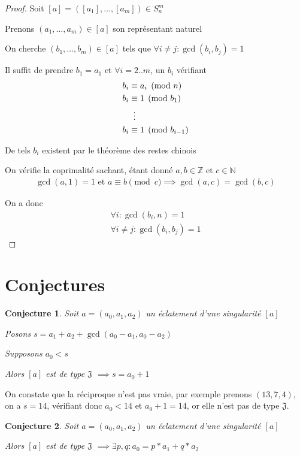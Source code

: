 \documentclass{article}
\newtheorem{conjecture}{Conjecture}
\begin{document}
\begin{proof}
    Soit $[a] = ([a_1], \dots, [a_m]) \in S_n^m$

    Prenons $(a_1, \dots, a_m) \in [a]$ son représentant naturel

    On cherche $(b_1, \dots, b_m) \in [a]$ tels que $\forall i \neq j : \gcd(b_i, b_j) = 1$

    Il suffit de prendre $b_1 = a_1$ et $\forall i = 2..m$, un $b_i$ vérifiant
    \begin{align*}
        b_i & \equiv a_i \pmod n \\
        b_i & \equiv 1 \pmod {b_1} \\
            & \vdotswithin{\equiv} \\
        b_i & \equiv 1 \pmod {b_{i-1}} 
    \end{align*}

    De tels $b_i$ existent par le théorème des restes chinois

    On vérifie la coprimalité sachant, étant donné $a, b \in \mathbb{Z}$ et $c \in \mathbb{N}$
    \begin{align*}
        \gcd(a, 1) =1 \text{ et } a \equiv b \pmod c \implies \gcd(a, c) = \gcd(b, c)
    \end{align*}

    On a donc
    \begin{align*}
        \forall i : \gcd(b_i, n) = 1 \\
        \forall i\neq j : \gcd(b_i, b_j) = 1
    \end{align*}
\end{proof}

\section{Conjectures}

\begin{conjecture}
    Soit $a=(a_0, a_1, a_2)$ un éclatement d'une singularité $[a]$

    Posons $s = a_1 + a_2 + \gcd(a_0-a_1, a_0-a_2)$

    Supposons $a_0 < s$

    Alors $[a]$ est de type $\mathfrak{J}$ $\implies s = a_0 + 1$
\end{conjecture}

On constate que la réciproque n'est pas vraie, par exemple prenons $(13, 7, 4)$, on a $s = 14$, vérifiant donc $a_0 < 14$ et $a_0 + 1 = 14$, or elle n'est pas de type $\mathfrak{J}$.

\begin{conjecture}
    Soit $a=(a_0, a_1, a_2)$ un éclatement d'une singularité $[a]$

    Alors $[a]$ est de type $\mathfrak{J}$ $\implies \exists p, q: a_0 = p*a_1 + q*a_2$
\end{conjecture}
\end{document}
